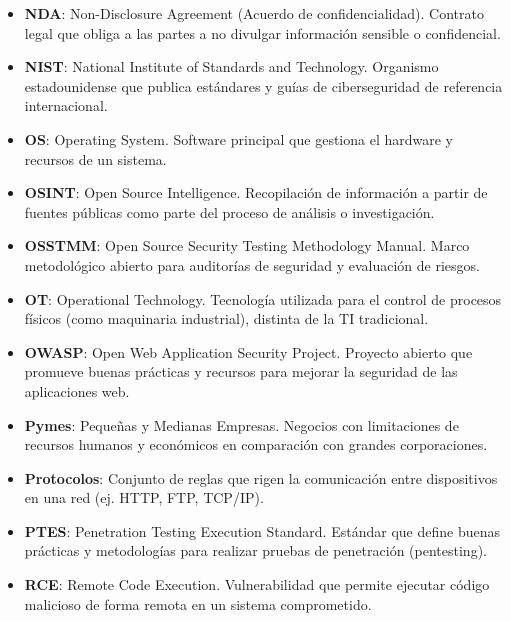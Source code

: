 \documentclass[a4paper, 11pt]{article}
\begin{document}
\begin{itemize}
    \item \textbf{NDA}: Non-Disclosure Agreement (Acuerdo de confidencialidad). Contrato legal que obliga a las partes a no divulgar información sensible o confidencial.

    \item \textbf{NIST}: National Institute of Standards and Technology. Organismo estadounidense que publica estándares y guías de ciberseguridad de referencia internacional.

    \item \textbf{OS}: Operating System. Software principal que gestiona el hardware y recursos de un sistema.

    \item \textbf{OSINT}: Open Source Intelligence. Recopilación de información a partir de fuentes públicas como parte del proceso de análisis o investigación.

    \item \textbf{OSSTMM}: Open Source Security Testing Methodology Manual. Marco metodológico abierto para auditorías de seguridad y evaluación de riesgos.

    \item \textbf{OT}: Operational Technology. Tecnología utilizada para el control de procesos físicos (como maquinaria industrial), distinta de la TI tradicional.

    \item \textbf{OWASP}: Open Web Application Security Project. Proyecto abierto que promueve buenas prácticas y recursos para mejorar la seguridad de las aplicaciones web.

    \item \textbf{Pymes}: Pequeñas y Medianas Empresas. Negocios con limitaciones de recursos humanos y económicos en comparación con grandes corporaciones.

    \item \textbf{Protocolos}: Conjunto de reglas que rigen la comunicación entre dispositivos en una red (ej. HTTP, FTP, TCP/IP).

    \item \textbf{PTES}: Penetration Testing Execution Standard. Estándar que define buenas prácticas y metodologías para realizar pruebas de penetración (pentesting).

    \item \textbf{RCE}: Remote Code Execution. Vulnerabilidad que permite ejecutar código malicioso de forma remota en un sistema comprometido.


\end{itemize}
\end{document}
